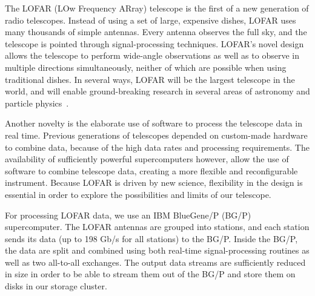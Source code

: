 \documentclass{llncs}
\begin{document}


The LOFAR (LOw Frequency ARray) telescope is the first of a new generation of radio telescopes. Instead of using a set of large, expensive dishes, LOFAR uses many thousands of simple antennas. Every antenna observes the full sky, and the telescope is pointed through signal-processing techniques. LOFAR's novel design allows the telescope to perform wide-angle observations as well as to observe in multiple directions simultaneously, neither of which are possible when using traditional dishes. In several ways, LOFAR will be the largest telescope in the world, and will enable ground-breaking research in several areas of astronomy and particle physics~\cite{Bruyn:02}.

Another novelty is the elaborate use of software to process the telescope data in real time. Previous generations of telescopes depended on custom-made hardware to combine data, because of the high data rates and processing requirements. The availability of sufficiently powerful supercomputers however, allow the use of software to combine telescope data, creating a more flexible and reconfigurable instrument. Because LOFAR is driven by new science, flexibility in the design is essential in order to explore the possibilities and limits of our telescope. 

For processing LOFAR data, we use an IBM BlueGene/P (BG/P) supercomputer. The LOFAR antennas are grouped into stations, and each station sends its data (up to 198 Gb/s for all stations) to the BG/P. Inside the BG/P, the data are split and combined using both real-time signal-processing routines as well as two all-to-all exchanges. The output data streams are sufficiently reduced in size in order to be able to stream them out of the BG/P and store them on disks in our storage cluster.
\end{document}
